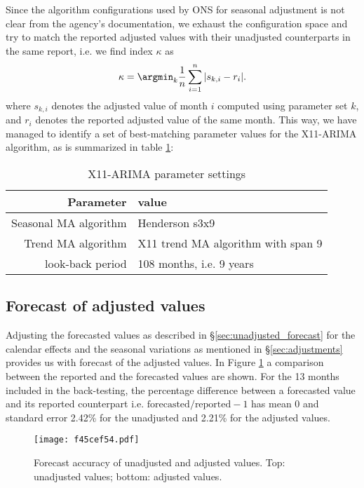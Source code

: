 \documentclass[a4paper,11pt,pdftex,twoside,titlepage]{article}
\begin{document}
Since the algorithm configurations used by ONS for seasonal adjustment is
not clear from the agency's documentation, we exhaust the
configuration space and try to match the reported adjusted values
with their unadjusted counterparts in the same report, i.e. we
find index $\kappa$ as
\begin{equation}
  \label{eq:gt554}
  \kappa = \argmin_{k} {1 \over n} \sum_{i=1}^n |s_{k, i} - r_i|.
\end{equation}
where $s_{k, i}$ denotes the adjusted value of month $i$ computed
using parameter set $k$, and $r_i$ denotes the reported adjusted value
of the same month. This way, we have managed to identify a set of
best-matching parameter values for the X11-ARIMA algorithm, as is
summarized in table \ref{tab:vt5h54}:
\begin{table}[htb!]
  \centering
  \begin{tabular}{r|l}
    Parameter & value \\
    \hline
    Seasonal MA algorithm & Henderson s3x9 \\
    Trend MA algorithm & X11 trend MA algorithm with span 9 \\
    look-back period & 108 months, i.e. 9 years
  \end{tabular}
  \caption{X11-ARIMA parameter settings}
  \label{tab:vt5h54}
\end{table}

\subsection{Forecast of adjusted values}
Adjusting the forecasted values as described in
\S\ref{sec:unadjusted_forecast} for the calendar effects and the
seasonal variations as mentioned in \S\ref{sec:adjustments} provides
us with forecast of the adjusted values. In Figure \ref{fig:f45cef54}
a comparison between the reported and the forecasted values are
shown. For the 13 months included in the back-testing, the percentage
difference between a forecasted value and its reported counterpart
i.e. $\text{forecasted}/\text{reported} - 1$ has mean 0 and standard
error 2.42\% for the unadjusted and 2.21\% for the adjusted values.
\begin{figure}[htb!]
  \centering
  \texttt{[image: f45cef54.pdf]}
  \caption{Forecast accuracy of unadjusted and adjusted values. Top:
    unadjusted values; bottom: adjusted values.
  }
  \label{fig:f45cef54}
\end{figure}
\end{document}
